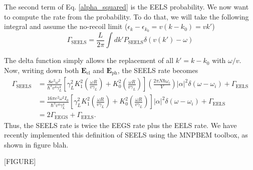 \documentclass [11pt, proquest] {uwthesis}[2016/11/22]
\begin{document}
The second term of Eq. \ref{alpha_squared} is the EELS probability. We now want to compute the rate from the probability. To do that, we will take the following integral and assume the no-recoil limit ($\epsilon_k - \epsilon_{k_0} = v(k-k_0) = vk'$)
\begin{equation}
\Gamma_{\textrm{SEELS}} = \frac{L}{2\pi}\int dk' P_{\textrm{SEELS}} \delta(v(k')-\omega)
\label{prob_to_rate}
\end{equation}

The delta function simply allows the replacement of all $k' = k-k_0$ with $\omega/v$. Now, writing down both $\textbf{E}_{\textrm{el}}$ and $\textbf{E}_{\textrm{ph}}$, the SEELS rate becomes
\begin{equation}
\begin{aligned}
\Gamma_{\textrm{SEELS}} &= \frac{8e^2\omega^2}{\hbar^3v^4\gamma_{L}^4}\left[\gamma_{L}^2K_1^2\left(\frac{\omega R}{v\gamma_L}\right)+K_0^2\left(\frac{\omega R}{v\gamma_L}\right)\right]\left(\frac{2\pi N\hbar\omega_i}{V}\right)|\alpha|^2\delta(\omega-\omega_i) + \Gamma_{\textrm{EELS}}\\
& = \frac{16\pi e^2\omega^2 I_0}{\hbar^3v^4\gamma_{L}^4}\left[\gamma_{L}^2K_1^2\left(\frac{\omega R}{v\gamma_L}\right)+K_0^2\left(\frac{\omega R}{v\gamma_L}\right)\right]|\alpha|^2\delta(\omega-\omega_i) + \Gamma_{\textrm{EELS}}\\
& = 2\Gamma_{\textrm{EEGS}} + \Gamma_{\textrm{EELS}}.
\label{seels_eegs}
\end{aligned}
\end{equation}
Thus, the SEELS rate is twice the EEGS rate plus the EELS rate. We have recently implemented this definition of SEELS using the MNPBEM toolbox\cite{Hohenester2012,Hohenester2014}, as shown in figure blah.

[FIGURE]
\end{document}
